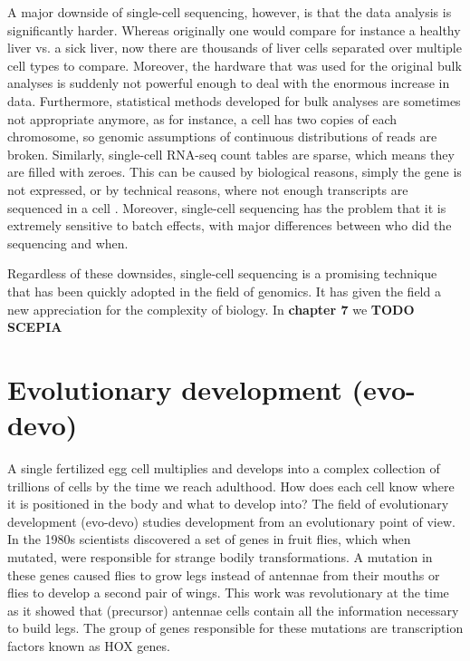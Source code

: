 A major downside of single-cell sequencing, however, is that the data analysis is significantly harder. Whereas originally one would compare for instance a healthy liver vs. a sick liver, now there are thousands of liver cells separated over multiple cell types to compare. Moreover, the hardware that was used for the original bulk analyses is suddenly not powerful enough to deal with the enormous increase in data. Furthermore, statistical methods developed for bulk analyses are sometimes not appropriate anymore, as for instance, a cell has two copies of each chromosome, so genomic assumptions of continuous distributions of reads are broken. Similarly, single-cell RNA-seq count tables are sparse, which means they are filled with zeroes. This can be caused by biological reasons, simply the gene is not expressed, or by technical reasons, where not enough transcripts are sequenced in a cell \cite{Jiang2022}. Moreover, single-cell sequencing has the problem that it is extremely sensitive to batch effects, with major differences between who did the sequencing and when.

Regardless of these downsides, single-cell sequencing is a promising technique that has been quickly adopted in the field of genomics. It has given the field a new appreciation for the complexity of biology. In \textbf{chapter 7} we \textbf{ TODO SCEPIA}

\section{Evolutionary development (evo-devo)}

A single fertilized egg cell multiplies and develops into a complex collection of trillions of cells by the time we reach adulthood. How does each cell know where it is positioned in the body and what to develop into? The field of evolutionary development (evo-devo) studies development from an evolutionary point of view. In the 1980s scientists discovered a set of genes in fruit flies, which when mutated, were responsible for strange bodily transformations. A mutation in these genes caused flies to grow legs instead of antennae from their mouths\cite{Schneuwly1987} or flies to develop a second pair of wings\cite{Weatherbee1998}. This work was revolutionary at the time as it showed that (precursor) antennae cells contain all the information necessary to build legs. The group of genes responsible for these mutations are transcription factors known as HOX genes.

